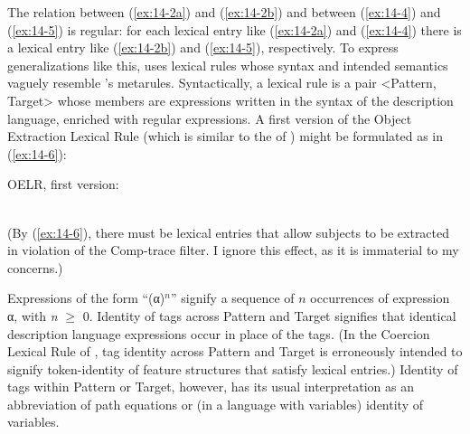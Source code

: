 \documentclass[output=paper]{LSP/langsci}
\begin{document}
\zs
\randnum\label{rn:14-13}The relation between (\ref{ex:14-2a}) and (\ref{ex:14-2b}) and between (\ref{ex:14-4}) and (\ref{ex:14-5}) is regular: for each lexical entry like (\ref{ex:14-2a}) and (\ref{ex:14-4}) there is a lexical entry like
(\ref{ex:14-2b}) and (\ref{ex:14-5}), respectively. To express generalizations like this, \citet{PollardSagE1994} uses lexical rules whose syntax and intended semantics vaguely resemble 's metarules. Syntactically, a lexical rule is a pair <Pattern, Target> whose members are expressions written in the syntax of the description language, enriched with regular expressions. A first version of the Object Extraction Lexical Rule (which is similar to the  of \citealt[446]{PollardSag1992}) might be formulated as in (\ref{ex:14-6}):
\begin{exe}
\ex
\label{ex:14-6}
OELR, first version: \\
\\

\end{exe}
(By (\ref{ex:14-6}), there must be lexical entries that allow subjects to be
extracted in violation of the Comp-trace filter. I ignore this effect,
as it is immaterial to my concerns.)

\randnum\label{rn:14-14}Expressions of the form ``(α)$^{n}$'' signify a sequence of $n$ occurrences of expression α, with \textit{n} $\ge$ 0. Identity of tags across Pattern and Target signifies that identical description language expressions occur in place of the tags. (In the Coercion Lexical Rule of \citet[314]{PollardSagE1994}, tag identity across Pattern and Target is
erroneously intended to signify token-identity of feature structures
that satisfy lexical entries.) Identity of tags within Pattern or
Target, however, has its usual interpretation as an abbreviation of
path equations or (in a language with variables) identity of
variables.
\end{document}
